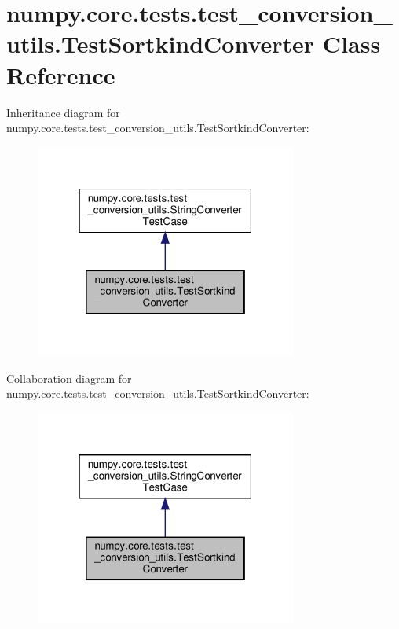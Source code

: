 \hypertarget{classnumpy_1_1core_1_1tests_1_1test__conversion__utils_1_1TestSortkindConverter}{}\section{numpy.\+core.\+tests.\+test\+\_\+conversion\+\_\+utils.\+Test\+Sortkind\+Converter Class Reference}
\label{classnumpy_1_1core_1_1tests_1_1test__conversion__utils_1_1TestSortkindConverter}


Inheritance diagram for numpy.\+core.\+tests.\+test\+\_\+conversion\+\_\+utils.\+Test\+Sortkind\+Converter\+:
\nopagebreak
\begin{figure}[H]
\begin{center}
\leavevmode
\includegraphics[width=244pt]{classnumpy_1_1core_1_1tests_1_1test__conversion__utils_1_1TestSortkindConverter__inherit__graph}
\end{center}
\end{figure}


Collaboration diagram for numpy.\+core.\+tests.\+test\+\_\+conversion\+\_\+utils.\+Test\+Sortkind\+Converter\+:
\nopagebreak
\begin{figure}[H]
\begin{center}
\leavevmode
\includegraphics[width=244pt]{classnumpy_1_1core_1_1tests_1_1test__conversion__utils_1_1TestSortkindConverter__coll__graph}
\end{center}
\end{figure}

